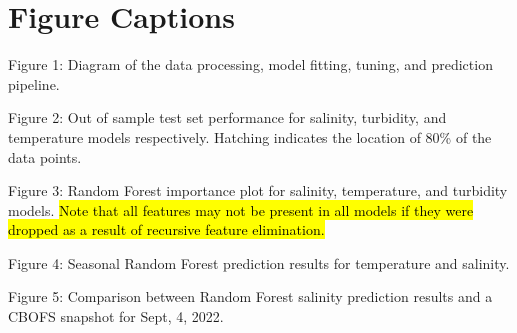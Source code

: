 \documentclass{article}
\begin{document}
\clearpage

\section*{Figure Captions}

\begin{description}
    \item Figure 1: Diagram of the data processing, model fitting, tuning, and prediction pipeline.
    \item Figure 2: Out of sample test set performance for salinity, turbidity, and temperature models respectively. Hatching indicates the location of 80\% of the data points.
    \item Figure 3: Random Forest importance plot for salinity, temperature, and turbidity models. \hl{Note that all features may not be present in all models if they were dropped as a result of recursive feature elimination.}
    \item Figure 4: Seasonal Random Forest prediction results for temperature and salinity.
    \item Figure 5: Comparison between Random Forest salinity prediction results and a CBOFS snapshot for Sept, 4, 2022.
\end{description}
\end{document}
